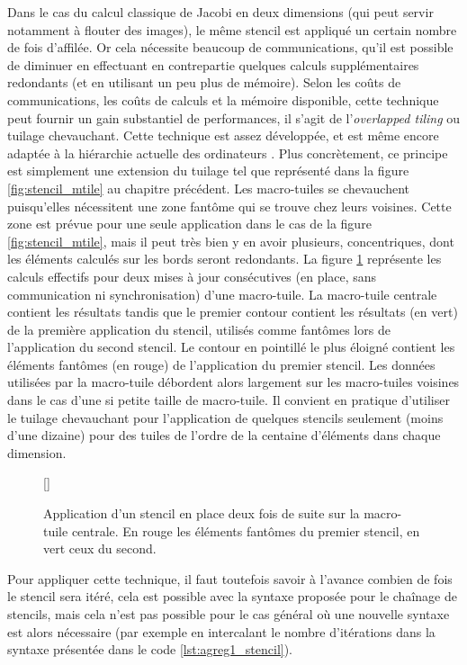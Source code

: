 Dans le cas du calcul classique de Jacobi en deux dimensions (qui peut servir notamment à flouter des images), le même stencil est appliqué un certain nombre de fois d'affilée. Or cela nécessite beaucoup de communications, qu'il est possible de diminuer en effectuant en contrepartie quelques calculs supplémentaires redondants (et en utilisant un peu plus de mémoire). Selon les coûts de communications, les coûts de calculs et la mémoire disponible, cette technique peut fournir un gain substantiel de performances, il s'agit de l'\emph{overlapped tiling} ou tuilage chevauchant. Cette technique est assez développée, et est même encore adaptée à la hiérarchie actuelle des ordinateurs \cite{Art17}. Plus concrètement, ce principe est simplement une extension du tuilage tel que représenté dans la figure \ref{fig:stencil_mtile} au chapitre précédent. Les macro-tuiles se chevauchent puisqu'elles nécessitent une zone fantôme qui se trouve chez leurs voisines. Cette zone est prévue pour une seule application dans le cas de la figure \ref{fig:stencil_mtile}, mais il peut très bien y en avoir plusieurs, concentriques, dont les éléments calculés sur les bords seront redondants. La figure \ref{fig:stencil_mtile2} représente les calculs effectifs pour deux mises à jour consécutives (en place, sans communication ni synchronisation) d'une macro-tuile. La macro-tuile centrale contient les résultats tandis que le premier contour contient les résultats (en vert) de la première application du stencil, utilisés comme fantômes lors de l'application du second stencil. Le contour en pointillé le plus éloigné contient les éléments fantômes (en rouge) de l'application du premier stencil. Les données utilisées par la macro-tuile débordent alors largement sur les macro-tuiles voisines dans le cas d'une si petite taille de macro-tuile. Il convient en pratique d'utiliser le tuilage chevauchant pour l'application de quelques stencils seulement (moins d'une dizaine) pour des tuiles de l'ordre de la centaine d'éléments dans chaque dimension.

\begin{figure}[!h]
[\FBwidth]
{\caption{Application d'un stencil en place deux fois de suite sur la macro-tuile centrale. En rouge les éléments fantômes du premier stencil, en vert ceux du second.}\label{fig:stencil_mtile2}}
{}
\end{figure}

Pour appliquer cette technique, il faut toutefois savoir à l'avance combien de fois le stencil sera itéré, cela est possible avec la syntaxe proposée pour le chaînage de stencils, mais cela n'est pas possible pour le cas général où une nouvelle syntaxe est alors nécessaire (par exemple en intercalant le nombre d'itérations dans la syntaxe présentée dans le code \ref{lst:agreg1_stencil}). 

